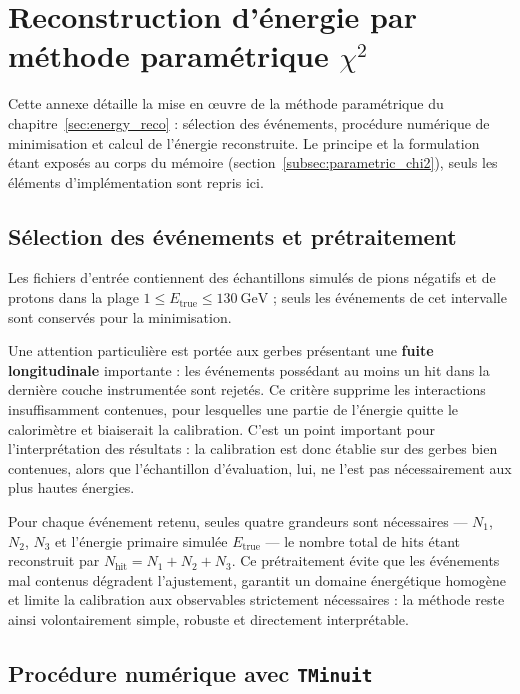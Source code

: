 \chapter{Reconstruction d'énergie par méthode paramétrique \texorpdfstring{$\chi^2$}{chi²}}
\label{app:chi2}

Cette annexe détaille la mise en œuvre de la méthode paramétrique du chapitre~\ref{sec:energy_reco} :
sélection des événements, procédure numérique de minimisation et calcul de l'énergie reconstruite.
Le principe et la formulation étant exposés au corps du mémoire (section~\ref{subsec:parametric_chi2}),
seuls les éléments d'implémentation sont repris ici.

\section{Sélection des événements et prétraitement}

Les fichiers d'entrée contiennent des échantillons simulés de pions négatifs et de protons dans la plage \(1 \leq E_{\mathrm{true}} \leq 130~\mathrm{GeV}\) ; seuls les événements de cet intervalle sont conservés pour la minimisation.

Une attention particulière est portée aux gerbes présentant une \textbf{fuite longitudinale} importante : les événements possédant au moins un hit dans la dernière couche instrumentée sont rejetés. Ce critère supprime les interactions insuffisamment contenues, pour lesquelles une partie de l'énergie quitte le calorimètre et biaiserait la calibration. C'est un point important pour l'interprétation des résultats : la calibration est donc établie sur des gerbes bien contenues, alors que l'échantillon d'évaluation, lui, ne l'est pas nécessairement aux plus hautes énergies.

Pour chaque événement retenu, seules quatre grandeurs sont nécessaires — \(N_1\), \(N_2\), \(N_3\) et l'énergie primaire simulée \(E_{\mathrm{true}}\) — le nombre total de hits étant reconstruit par \(N_{\mathrm{hit}}=N_1+N_2+N_3\). Ce prétraitement évite que les événements mal contenus dégradent l'ajustement, garantit un domaine énergétique homogène et limite la calibration aux observables strictement nécessaires : la méthode reste ainsi volontairement simple, robuste et directement interprétable.

\section{Procédure numérique avec \texttt{TMinuit}}

